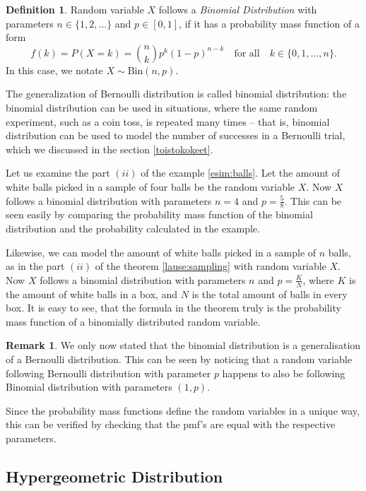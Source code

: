 \documentclass[12pt,a4paper,leqno]{report}
\theoremstyle{plain}
\theoremstyle{definition}
\newtheorem{maar}[equation]{Definition}
\newtheorem{remark}[equation]{Remark}
\begin{document}
\begin{maar}
Random variable $X$ follows a \emph{Binomial Distribution} with parameters $n \in \{1,2, \dots \}$ and $p \in [0,1]$, if it has a probability mass function of a form
\[
f(k) = P(X=k) = \binom{n}{k} p^k (1-p)^{n-k} \quad \text{for all} \quad k \in \{0,1, \dots, n\}.
\]
In this case, we notate $X \sim \text{Bin} (n,p)$.
\end{maar}

The generalization of Bernoulli distribution is called binomial distribution: the binomial distribution can be used in situations, where the same random experiment, such as a coin toss, is repeated many times -- that is, binomial distribution can be used to model the number of successes in a Bernoulli trial, which we discussed in the section \ref{toistokokeet}.

\bigskip

Let us examine the part $(ii)$ of the example \ref{esim:balls}. Let the amount of white balls picked in a sample of four balls be the random variable $X$. Now $X$ follows a binomial distribution with parameters $n=4$ and $p = \frac{5}{8}$. This can be seen easily by comparing the probability mass function of the binomial distribution and the probability calculated in the example.

Likewise, we can model the amount of white balls picked in a sample of $n$ balls, as in the part $(ii)$ of the theorem \ref{lause:sampling} with random variable $X$. Now $X$ follows a binomial distribution with parameters $n$ and $p = \frac{K}{N}$, where $K$ is the amount of white balls in a box, and $N$ is the total amount of balls in every box. It is easy to see, that the formula in the theorem truly is the probability mass function of a binomially distributed random variable.

\begin{remark}
We only now stated that the binomial distribution is a generalisation of a Bernoulli distribution. This can be seen by noticing that a random variable following Bernoulli distribution with parameter $p$ happens to also be following Binomial distribution with parameters $(1,p)$.

Since the probability mass functions define the random variables in a unique way, this can be verified by checking that the pmf's are equal with the respective parameters.
\end{remark}

\subsection{Hypergeometric Distribution}
\end{document}
